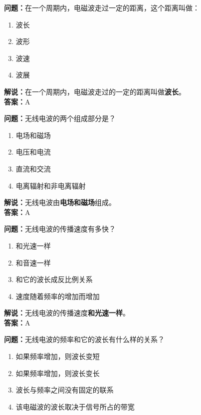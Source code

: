 \textbf{问题：}在一个周期内，电磁波走过一定的距离，这个距离叫做：

\begin{enumerate}[label=\Alph*), leftmargin=1cm]
	\item 波长
	\item 波形
	\item 波速
	\item 波展
\end{enumerate}

\textbf{解说：}在一个周期内，电磁波走过的一定的距离叫做\textbf{波长}。\\\textbf{答案：}A%



\textbf{问题：}无线电波的两个组成部分是？

\begin{enumerate}[label=\Alph*), leftmargin=1cm]
	\item 电场和磁场
	\item 电压和电流
	\item 直流和交流
	\item 电离辐射和非电离辐射
\end{enumerate}

\textbf{解说：}无线电波由\textbf{电场和磁场}组成。\\\textbf{答案：}A%



\textbf{问题：}无线电波的传播速度有多快？

\begin{enumerate}[label=\Alph*), leftmargin=1cm]
	\item 和光速一样
	\item 和音速一样
	\item 和它的波长成反比例关系
	\item 速度随着频率的增加而增加
\end{enumerate}

\textbf{解说：}无线电波的传播速度\textbf{和光速一样}。\\\textbf{答案：}A



\textbf{问题：}无线电波的频率和它的波长有什么样的关系？

\begin{enumerate}[label=\Alph*), leftmargin=1cm]
	\item 如果频率增加，则波长变短
	\item 如果频率增加，则波长变长
	\item 波长与频率之间没有固定的联系
	\item 该电磁波的波长取决于信号所占的带宽
\end{enumerate}

